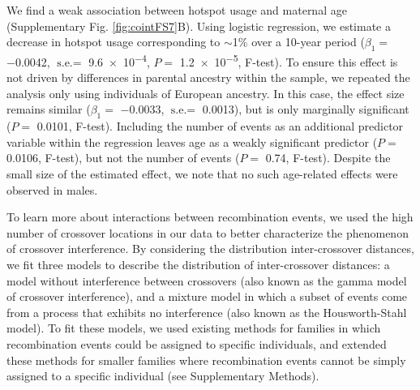 
We find a weak association between hotspot usage and
maternal age (Supplementary Fig. \ref{fig:cointFS7}B). Using logistic regression,
we estimate a decrease in hotspot usage corresponding to
$\sim$1\% over a 10-year period ($\beta_1=$ \num{-0.0042}, $\text{s.e.}=$ \num{9.6e-4}, 
$P=$ \num{1.2e-5}, F-test). To ensure this effect is not driven by
differences in parental ancestry within the sample, we repeated
the analysis only using individuals of European ancestry. In this
case, the effect size remains similar ($\beta_1=$ \num{-0.0033}, $\text{s.e.}=$ 0.0013),
but is only marginally significant ($P=$ 0.0101, F-test). Including
the number of events as an additional predictor variable within
the regression leaves age as a weakly significant predictor
($P=$ 0.0106, F-test), but not the number of events ($P=$ 0.74,
F-test). Despite the small size of the estimated effect, we note that
no such age-related effects were observed in males.

To learn more about interactions between recombination
events, we used the high number of crossover locations in our
data to better characterize the phenomenon of crossover
interference. By considering the distribution inter-crossover
distances, we fit three models to describe the distribution of
inter-crossover distances: a model without interference between
crossovers (also known as the gamma model of crossover
interference\cite{Broman2000}), and a mixture model in which a subset of
events come from a process that exhibits no interference (also
known as the Housworth-Stahl model\cite{Housworth2003}). To fit these models, we
used existing methods for families in which recombination events
could be assigned to specific individuals, and extended these
methods for smaller families where recombination events cannot
be simply assigned to a specific individual (see Supplementary
Methods).

